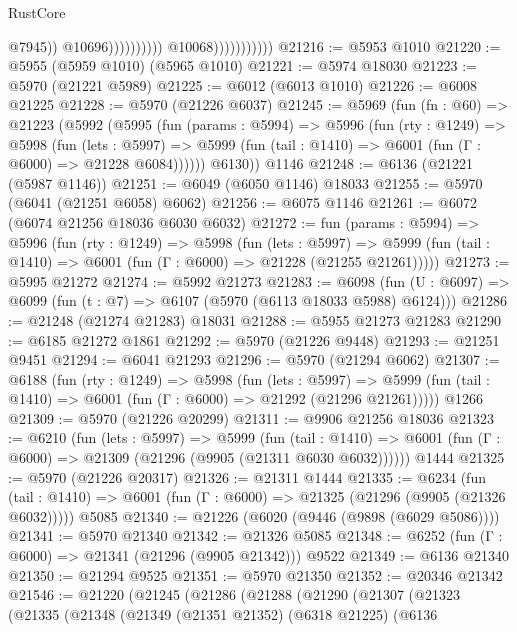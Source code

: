 \begin{lexlean}{RustCore}
\begin{coremodule}
                                                  @7945))
                                              @10696))))))))))
                          @10068)))))))))))
@21216 := @5953 @1010
@21220 := @5955 (@5959 @1010) (@5965 @1010)
@21221 := @5974 @18030
@21223 := @5970 (@21221 @5989)
@21225 := @6012 (@6013 @1010)
@21226 := @6008 @21225
@21228 := @5970 (@21226 @6037)
@21245 := @5969
    (fun (fn : @60) =>
    @21223
      (@5992
        (@5995
          (fun (params : @5994) =>
          @5996
            (fun (rty : @1249) =>
            @5998
              (fun (lets : @5997) =>
              @5999 (fun (tail : @1410) => @6001 (fun (Γ : @6000) => @21228 @6084))))))
        @6130))
    @1146
@21248 := @6136 (@21221 (@5987 @1146))
@21251 := @6049 (@6050 @1146) @18033
@21255 := @5970 (@6041 (@21251 @6058) @6062)
@21256 := @6075 @1146
@21261 := @6072 (@6074 @21256 @18036 @6030 @6032)
@21272 := fun (params : @5994) =>
  @5996
    (fun (rty : @1249) =>
    @5998
      (fun (lets : @5997) =>
      @5999 (fun (tail : @1410) => @6001 (fun (Γ : @6000) => @21228 (@21255 @21261)))))
@21273 := @5995 @21272
@21274 := @5992 @21273
@21283 := @6098
    (fun (U : @6097) => @6099 (fun (t : @7) => @6107 (@5970 (@6113 @18033 @5988) @6124)))
@21286 := @21248 (@21274 @21283) @18031
@21288 := @5955 @21273 @21283
@21290 := @6185 @21272 @1861
@21292 := @5970 (@21226 @9448)
@21293 := @21251 @9451
@21294 := @6041 @21293
@21296 := @5970 (@21294 @6062)
@21307 := @6188
    (fun (rty : @1249) =>
    @5998
      (fun (lets : @5997) =>
      @5999 (fun (tail : @1410) => @6001 (fun (Γ : @6000) => @21292 (@21296 @21261)))))
    @1266
@21309 := @5970 (@21226 @20299)
@21311 := @9906 @21256 @18036
@21323 := @6210
    (fun (lets : @5997) =>
    @5999
      (fun (tail : @1410) =>
      @6001 (fun (Γ : @6000) => @21309 (@21296 (@9905 (@21311 @6030 @6032))))))
    @1444
@21325 := @5970 (@21226 @20317)
@21326 := @21311 @1444
@21335 := @6234
    (fun (tail : @1410) => @6001 (fun (Γ : @6000) => @21325 (@21296 (@9905 (@21326 @6032)))))
    @5085
@21340 := @21226 (@6020 (@9446 (@9898 (@6029 @5086))))
@21341 := @5970 @21340
@21342 := @21326 @5085
@21348 := @6252 (fun (Γ : @6000) => @21341 (@21296 (@9905 @21342))) @9522
@21349 := @6136 @21340
@21350 := @21294 @9525
@21351 := @5970 @21350
@21352 := @20346 @21342
@21546 := @21220
    (@21245
      (@21286
        (@21288
          (@21290
            (@21307
              (@21323
                (@21335
                  (@21348
                    (@21349
                      (@21351 @21352)
                      (@6318 @21225)
                      (@6136

\end{coremodule}
\end{lexlean}
